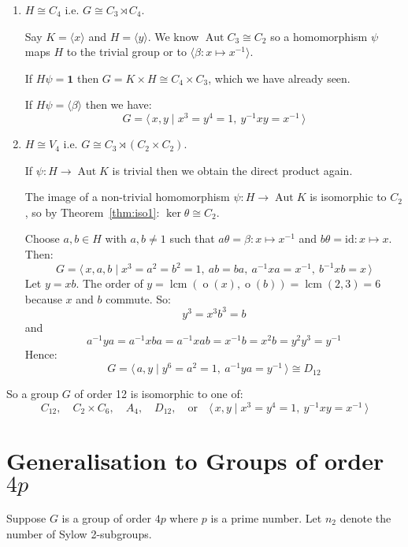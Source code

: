 \documentclass[a4paper, oneside, 12pt, final]{article}
\theoremstyle{definition}
\DeclareMathOperator{\Aut}{Aut}
\DeclareMathOperator{\order}{o}
\DeclareMathOperator{\lcm}{lcm}
\begin{document}
\begin{enumerate}
    \item \(H \cong C_4\) i.e. \(G \cong C_3 \rtimes C_4\).

        Say \(K = \langle x \rangle\) and \(H = \langle y \rangle\).
        We know \(\Aut{C_3} \cong C_2\) so a homomorphism \(\psi\) maps \(H\) to the trivial group or to \(\langle
        \beta:x \mapsto x^{-1} \rangle\).

        If \(H\psi = \bm{1}\) then \(G = K \times H \cong C_4 \times C_3\), which we have already seen.

        If \(H\psi = \langle \beta \rangle\) then we have:
        \[G = \langle\, x, y \mid x^3 = y^4 = 1,\ y^{-1}xy = x^{-1}\,\rangle\]

    \item \(H \cong V_4\) i.e. \(G \cong C_3 \rtimes (C_2 \times C_2)\).

        If \(\psi:H \to \Aut{K}\) is trivial then we obtain the direct product again.

        The image of a non-trivial homomorphism \(\psi:H \to \Aut{K}\) is isomorphic to \(C_2\), so by
        Theorem~\ref{thm:iso1}: \(\ker{\theta} \cong C_2\).

        Choose \(a, b \in H\) with \(a, b \neq 1\) such that \(a\theta = \beta:x \mapsto x^{-1}\) and \(b\theta =
        \text{id}:x \mapsto x\).
        Then:
        \[G = \langle\, x, a, b \mid x^3 = a^2 = b^2 = 1,\ ab = ba,\ a^{-1}xa = x^{-1},\ b^{-1}xb = x\,\rangle\]
        Let \(y = xb\).
        The order of \(y = \lcm{(\order{(x)}, \order{(b)})} = \lcm{(2, 3)} = 6\) because \(x\) and \(b\) commute.
        So:
        \[y^3 = x^3b^3 = b\]
        and
        \[ a^{-1}ya = a^{-1}xba = a^{-1}xab = x^{-1}b = x^2b = y^2y^3 = y^{-1}\]
        Hence:
        \[G = \langle\, a, y \mid y^6 = a^2 = 1,\ a^{-1}ya = y^{-1}\,\rangle
        \cong D_{12}\]
\end{enumerate}

So a group \(G\) of order 12 is isomorphic to one of:
\[
    C_{12}, \quad%
    C_2 \times C_6, \quad%
    A_4, \quad%
    D_{12}, \quad \text{or} \quad%
    \langle\, x, y \mid x^3 = y^4 = 1,\ y^{-1}xy = x^{-1}\,\rangle
\]

\section{Generalisation to Groups of order \(4p\)}
Suppose \(G\) is a group of order \(4p\) where \(p\) is a prime number.
Let \(n_2\) denote the number of Sylow 2-subgroups.
\end{document}
